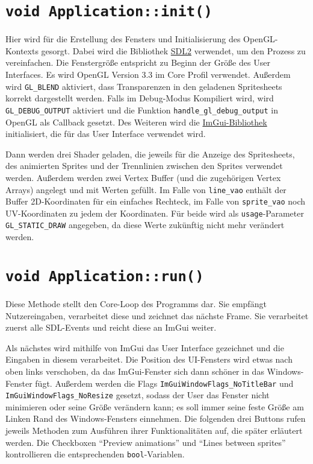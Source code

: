 \section{\lstinline{void Application::init()}}
Hier wird für die Erstellung des Fensters und Initialisierung des OpenGL-Kontexts gesorgt. Dabei wird die Bibliothek \href{https://www.libsdl.org/}{SDL2} verwendet, um den Prozess zu vereinfachen. Die Fenstergröße entspricht zu Beginn der Größe des User Interfaces. Es wird OpenGL Version 3.3 im Core Profil verwendet. Außerdem wird \lstinline{GL_BLEND} aktiviert, dass Trans­pa­renzen in den geladenen Spritesheets korrekt dargestellt werden. Falls im Debug-Modus Kompiliert wird, wird \lstinline{GL_DEBUG_OUTPUT} aktiviert und die Funktion \lstinline{handle_gl_debug_output} in OpenGL als Callback gesetzt. Des Weiteren wird die \href{https://github.com/ocornut/imgui}{ImGui-Bibliothek} initialisiert, die für das User Interface verwendet wird. 

Dann werden drei Shader geladen, die jeweils für die Anzeige des Spritesheets, des animierten Sprites und der Trennlinien zwischen den Sprites verwendet werden. Außerdem werden zwei Vertex Buffer (und die zugehörigen Vertex Arrays) angelegt und mit Werten gefüllt. Im Falle von \lstinline{line_vao} enthält der Buffer 2D-Koordinaten für ein einfaches Rechteck, im Falle von \lstinline{sprite_vao} noch UV-Koordinaten zu jedem der Koordinaten. Für beide wird als \lstinline{usage}-Parameter \lstinline{GL_STATIC_DRAW} angegeben, da diese Werte zukünftig nicht mehr verändert werden. 

\section{\lstinline{void Application::run()}}
Diese Methode stellt den Core-Loop des Programms dar. Sie empfängt Nutzereingaben, verarbeitet diese und zeichnet das nächste Frame. Sie verarbeitet zuerst alle SDL-Events und reicht diese an ImGui weiter.

Als nächstes wird mithilfe von ImGui das User Interface gezeichnet und die Eingaben in diesem verarbeitet. Die Position des UI-Fensters wird etwas nach oben links verschoben, da das ImGui-Fenster sich dann schöner in das Windows-Fenster fügt. Außerdem werden die Flags \lstinline{ImGuiWindowFlags_NoTitleBar} und \lstinline{ImGuiWindowFlags_NoResize} gesetzt, sodass der User das Fenster nicht minimieren oder seine Größe verändern kann; es soll immer seine feste Größe am Linken Rand des Windows-Fensters einnehmen. Die folgenden drei Buttons rufen jeweils Methoden zum Ausführen ihrer Funktionalitäten auf, die später erläutert werden. Die Checkboxen ``Preview animations'' und ``Lines between sprites'' kontrollieren die entsprechenden \lstinline{bool}-Variablen.

